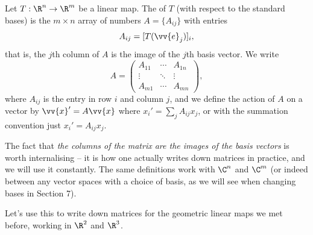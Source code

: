 \begin{definition}
	Let $T: \R^n \rightarrow \R^m$ be a linear map. The  of $T$ (with respect to the standard bases) is the $m \times n$ array of numbers $A = \{A_{ij}\}$ with entries
	$$
	A_{ij} = [T(\vv{e}_j)]_i,
	$$
	that is, the $j$th column of $A$ is the image of the $j$th basis vector. We write
	$$
	A = \begin{pmatrix}
		A_{11} & \cdots & A_{1n} \\
		\vdots & \ddots & \vdots \\
		A_{m1} & \cdots & A_{mn}
	\end{pmatrix},
	$$
	where $A_{ij}$ is the entry in row $i$ and column $j$, and we define the action of $A$ on a vector by $\vv{x}' = A \vv{x}$ where $x_i' = \sum_{j} A_{ij} x_j$, or with the summation convention just $x_i' = A_{ij}x_j$.
\end{definition}

The fact that \emph{the columns of the matrix are the images of the basis vectors} is worth internalising -- it is how one actually writes down matrices in practice, and we will use it constantly. The same definitions work with $\C^n$ and $\C^m$ (or indeed between any vector spaces with a choice of basis, as we will see when changing bases in Section 7).

Let's use this to write down matrices for the geometric linear maps we met before, working in $\R^2$ and $\R^3$.

